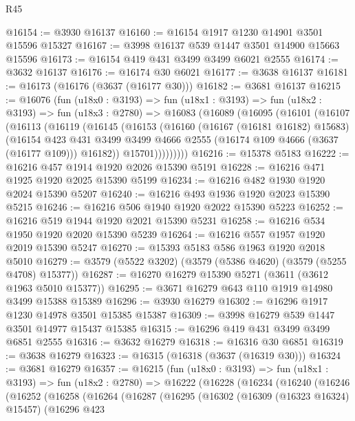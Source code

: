 \begin{lexlean}{R45}
\begin{coremodule}
@16154 := @3930 @16137
@16160 := @16154 @1917 @1230 @14901 @3501 @15596 @15327
@16167 := @3998 @16137 @539 @1447 @3501 @14900 @15663 @15596
@16173 := @16154 @419 @431 @3499 @3499 @6021 @2555
@16174 := @3632 @16137
@16176 := @16174 @30 @6021
@16177 := @3638 @16137
@16181 := @16173 (@16176 (@3637 (@16177 @30)))
@16182 := @3681 @16137
@16215 := @16076
    (fun (u18x0 : @3193) =>
    fun (u18x1 : @3193) =>
    fun (u18x2 : @3193) =>
    fun (u18x3 : @2780) =>
    @16083
      (@16089
        (@16095
          (@16101
            (@16107
              (@16113
                (@16119
                  (@16145
                    (@16153
                      (@16160
                        (@16167 (@16181 @16182) @15683)
                        (@16154
                          @423
                          @431
                          @3499
                          @3499
                          @4666
                          @2555
                          (@16174 @109 @4666 (@3637 (@16177 @109)))
                          @16182))
                      @15701)))))))))
@16216 := @15378 @5183
@16222 := @16216 @457 @1914 @1920 @2026 @15390 @5191
@16228 := @16216 @471 @1925 @1920 @2025 @15390 @5199
@16234 := @16216 @482 @1930 @1920 @2024 @15390 @5207
@16240 := @16216 @493 @1936 @1920 @2023 @15390 @5215
@16246 := @16216 @506 @1940 @1920 @2022 @15390 @5223
@16252 := @16216 @519 @1944 @1920 @2021 @15390 @5231
@16258 := @16216 @534 @1950 @1920 @2020 @15390 @5239
@16264 := @16216 @557 @1957 @1920 @2019 @15390 @5247
@16270 := @15393 @5183 @586 @1963 @1920 @2018 @5010
@16279 := @3579 (@5522 @3202) (@3579 (@5386 @4620) (@3579 (@5255 @4708) @15377))
@16287 := @16270 @16279 @15390 @5271 (@3611 (@3612 @1963 @5010 @15377))
@16295 := @3671 @16279 @643 @110 @1919 @14980 @3499 @15388 @15389
@16296 := @3930 @16279
@16302 := @16296 @1917 @1230 @14978 @3501 @15385 @15387
@16309 := @3998 @16279 @539 @1447 @3501 @14977 @15437 @15385
@16315 := @16296 @419 @431 @3499 @3499 @6851 @2555
@16316 := @3632 @16279
@16318 := @16316 @30 @6851
@16319 := @3638 @16279
@16323 := @16315 (@16318 (@3637 (@16319 @30)))
@16324 := @3681 @16279
@16357 := @16215
    (fun (u18x0 : @3193) =>
    fun (u18x1 : @3193) =>
    fun (u18x2 : @2780) =>
    @16222
      (@16228
        (@16234
          (@16240
            (@16246
              (@16252
                (@16258
                  (@16264
                    (@16287
                      (@16295
                        (@16302
                          (@16309 (@16323 @16324) @15457)
                          (@16296
                            @423

\end{coremodule}
\end{lexlean}
